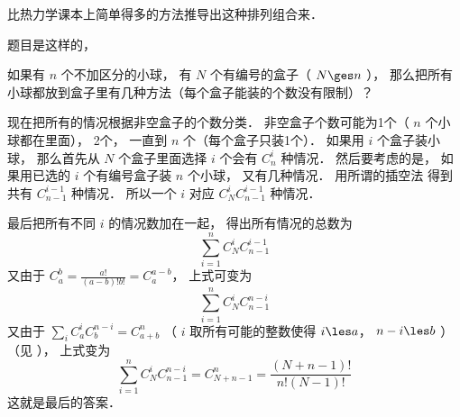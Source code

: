 
比热力学课本上简单得多的方法推导出这种排列组合来．

题目是这样的， 

如果有 $n$ 个不加区分的小球， 有 $N$ 个有编号的盒子（ $N \ges n$ ）， 那么把所有小球都放到盒子里有几种方法（每个盒子能装的个数没有限制）？

现在把所有的情况根据非空盒子的个数分类． 非空盒子个数可能为1个（ $n$ 个小球都在里面）， 2个， 一直到 $n$ 个（每个盒子只装1个）． 如果用 $i$ 个盒子装小球， 那么首先从 $N$ 个盒子里面选择 $i$ 个会有 $C_n^i$ 种情况． 然后要考虑的是， 如果用已选的 $i$ 个有编号盒子装 $n$ 个小球， 又有几种情况． 用所谓的插空法%
得到共有 $C_{n - 1}^{i - 1}$ 种情况． 所以一个 $i$ 对应 $C_N^iC_{n - 1}^{i - 1}$ 种情况．

最后把所有不同 $i$ 的情况数加在一起， 得出所有情况的总数为
  \begin{equation}
\sum\limits_{i = 1}^n {C_N^iC_{n - 1}^{i - 1}} 
\end{equation}
又由于 $C_a^b = \frac{a!}{(a - b)!b!} = C_a^{a - b}$，  上式可变为
   \begin{equation}
\sum\limits_{i = 1}^n {C_N^iC_{n - 1}^{n - i}} 
\end{equation}
又由于 $\sum\limits_i {C_a^iC_b^{n - i}}  = C_{a + b}^n$ （ $i$ 取所有可能的整数使得 $i \les a$，  $n - i \les b$  ）（见%
）， 上式变为
  \begin{equation}
\sum\limits_{i = 1}^n {C_N^iC_{n - 1}^{n - i}}  = C_{N + n - 1}^n = \frac{\left( {N + n - 1} \right)!}{n!\left( {N - 1} \right)!}
\end{equation}
这就是最后的答案．

